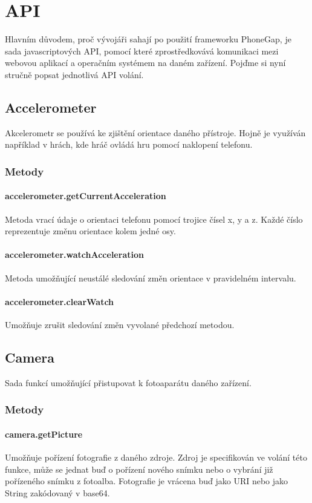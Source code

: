 \section{API} \label{Sec:API}
Hlavním důvodem, proč vývojáři sahají po použití frameworku PhoneGap, je sada javascriptových API, pomocí které zprostředkovává komunikaci mezi webovou aplikací a operačním systémem na daném zařízení. Pojďme si nyní stručně popsat jednotlivá API volání.

\subsection{Accelerometer}
Akcelerometr se používá ke zjištění orientace daného přístroje. Hojně je využíván například v hrách, kde hráč ovládá hru pomocí naklopení telefonu.

\subsubsection{Metody}
\paragraph{accelerometer.getCurrentAcceleration}
Metoda vrací údaje o orientaci telefonu pomocí trojice čísel x, y a z. Každé číslo reprezentuje změnu orientace kolem jedné osy.

\paragraph{accelerometer.watchAcceleration}
Metoda umožňující neustálé sledování změn orientace v pravidelném intervalu.

\paragraph{accelerometer.clearWatch}
Umožňuje zrušit sledování změn vyvolané předchozí metodou.

\subsection{Camera}
Sada funkcí umožňující přistupovat k fotoaparátu daného zařízení.

\subsubsection{Metody}
\paragraph{camera.getPicture}
Umožňuje pořízení fotografie z daného zdroje. Zdroj je specifikován ve volání této funkce, může se jednat buď o pořízení nového snímku nebo o vybrání již pořízeného snímku z fotoalba. Fotografie je vrácena buď jako URI nebo jako String zakódovaný v base64.

